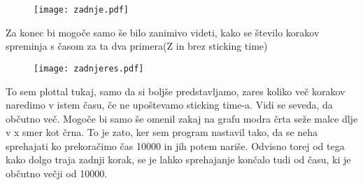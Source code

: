\documentclass{article}
\begin{document}
\begin{figure}[H]
\texttt{[image: zadnje.pdf]}
\end{figure}

Za konec bi mogoče samo še bilo zanimivo videti, kako se število korakov spreminja s časom za ta dva primera(Z in brez sticking time)

\begin{figure}[H]
\texttt{[image: zadnjeres.pdf]}
\end{figure}
To sem plottal tukaj, samo da si boljše predstavljamo, zares koliko več korakov naredimo v istem času, če ne upoštevamo sticking time-a. Vidi se seveda, da občutno več. Mogoče bi samo še omenil zakaj na grafu modra črta seže malce dlje v x smer kot črna. To je zato, ker sem program nastavil tako, da se neha sprehajati ko prekoračimo čas 10000 in jih potem nariše. Odvisno torej od tega kako dolgo traja zadnji korak, se je lahko sprehajanje končalo tudi od času, ki je občutno večji od 10000.
\end{document}
